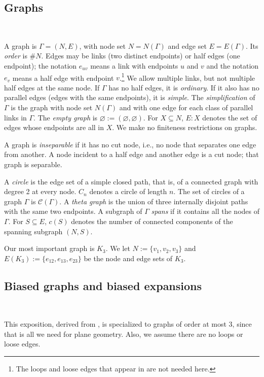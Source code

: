 \documentclass[reqno,12pt]{amsart}
\theoremstyle{remark}
\numberwithin{equation}{section}
\numberwithin{figure}{section}
\newcommand \eset{\emptyset}
\renewcommand \eset{\varnothing}
\newcommand \cC{\mathcal{C}}
\begin{document}
\subsection{Graphs}\label{graphs}\

A graph is $\Gamma = (N,E)$, with node set $N = N(\Gamma)$ and edge set $E = E(\Gamma)$.  
Its \emph{order} is $\#N$.  Edges may be links (two distinct endpoints) or half edges (one endpoint); the notation $e_{uv}$ means a link with endpoints $u$ and $v$ and the notation $e_v$ means a half edge with endpoint $v$.\footnote{The loops and loose edges that appear in \cite{BG} are not needed here.} We allow multiple links, but not multiple half edges at the same node.  If $\Gamma$ has no half edges, it is \emph{ordinary}.  If it also has no parallel edges (edges with the same endpoints), it is \emph{simple}.  The \emph{simplification} of $\Gamma$ is the graph with node set $N(\Gamma)$ and with one edge for each class of parallel links in $\Gamma$.  The \emph{empty graph} is $\eset := (\eset,\eset)$.  
For $X\subseteq N$, $E{:}X$ denotes the set of edges whose endpoints are all in $X$.  
We make no finiteness restrictions on graphs.  

A graph is \emph{inseparable} if it has no cut node, i.e., no node that separates one edge from another.  A node incident to a half edge and another edge is a cut node; that graph is separable.

A \emph{circle} is the edge set of a simple closed path, that is, of a connected graph with degree 2 at every node.  $C_n$ denotes a circle of length $n$.  The set of circles of a graph $\Gamma$ is $\cC(\Gamma)$.  A \emph{theta graph} is the union of three internally disjoint paths with the same two endpoints.  A subgraph of $\Gamma$ \emph{spans} if it contains all the nodes of $\Gamma$.  For $S \subseteq E$, $c(S)$ denotes the number of connected components of the spanning subgraph $(N,S)$.

Our most important graph is $K_3$.  We let $N:= \{v_1, v_2, v_3 \}$ and $E(K_3):= \{e_{12}, e_{13}, e_{23} \}$ be the node and edge sets of $K_3$.


\subsection{Biased graphs and biased expansions}\label{bg}\

This exposition, derived from \cite{BG}, is specialized to graphs of order at most 3, since that is all we need for plane geometry.  Also, we assume there are no loops or loose edges.
\end{document}

